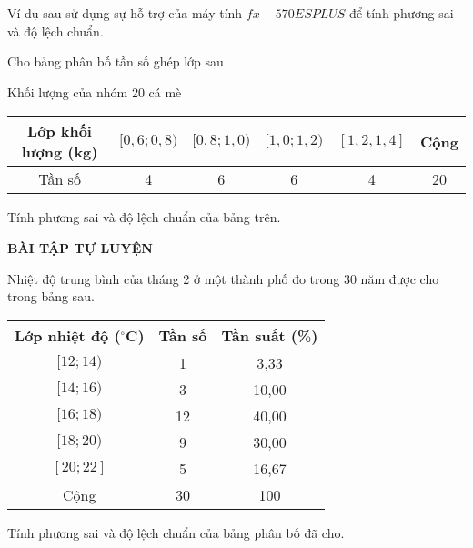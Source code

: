 Ví dụ sau sử dụng sự hỗ trợ của máy tính $fx-570ES PLUS$ để tính phương sai và độ lệch chuẩn.
\begin{vd}%
	Cho bảng phân bố tần số ghép lớp sau
	\begin{center}
		Khối lượng của nhóm 20 cá mè\\
		\begin{tabular}{|c|c|c|c|c|c|}
			\hline
			Lớp khối lượng (kg) & $[0,6;0,8)$ & $[0,8;1,0)$ & $[1,0;1,2)$ & $[1,2,1,4]$ & Cộng\\\hline
			Tần số & 4 & 6 & 6 & 4 & 20\\\hline
		\end{tabular}
	\end{center}
	Tính phương sai và độ lệch chuẩn của bảng trên.
\end{vd}
\begin{center}
	\textbf{BÀI TẬP TỰ LUYỆN}
\end{center}
\begin{bt}%
	Nhiệt độ trung bình của tháng 2 ở một thành phố đo trong 30 năm được cho trong bảng sau.
	\begin{center}
		\begin{tabular}{|c|c|c|}
			\hline
			Lớp nhiệt độ ($^{\circ}$C) & Tần số & Tần suất (\%)\\\hline
			$[12;14)$ & 1 & 3,33\\
			$[14;16)$ & 3 & 10,00\\
			$[16;18)$ & 12 & 40,00\\
			$[18;20)$ & 9 & 30,00\\
			$[20;22]$ & 5 & 16,67\\\hline
			Cộng & 30 & 100\\\hline
		\end{tabular}
	\end{center}
	Tính phương sai và độ lệch chuẩn của bảng phân bố đã cho.
\end{bt}

